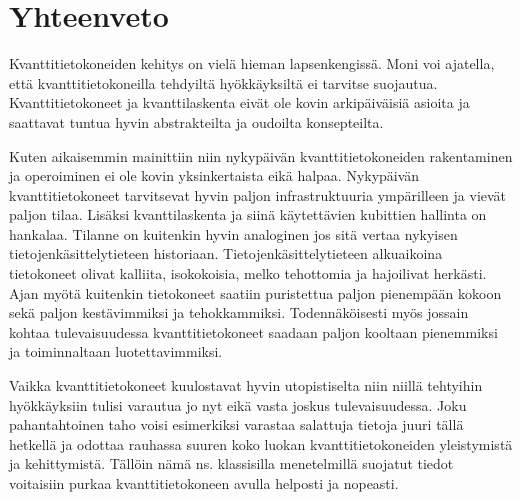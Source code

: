 \chapter{Yhteenveto\label{conclusions}}
Kvanttitietokoneiden kehitys on vielä hieman lapsenkengissä. Moni voi ajatella, että kvanttitietokoneilla tehdyiltä hyökkäyksiltä ei tarvitse suojautua. Kvanttitietokoneet ja kvanttilaskenta eivät ole kovin arkipäiväisiä asioita ja saattavat tuntua hyvin abstrakteilta ja oudoilta konsepteilta.

Kuten aikaisemmin mainittiin niin nykypäivän kvanttitietokoneiden rakentaminen ja operoiminen ei ole kovin yksinkertaista eikä halpaa. Nykypäivän kvanttitietokoneet tarvitsevat hyvin paljon infrastruktuuria ympärilleen ja vievät paljon tilaa. Lisäksi kvanttilaskenta ja siinä käytettävien kubittien hallinta on hankalaa. Tilanne on kuitenkin hyvin analoginen jos sitä vertaa nykyisen tietojenkäsittelytieteen historiaan. Tietojenkäsittelytieteen alkuaikoina tietokoneet olivat kalliita, isokokoisia, melko tehottomia ja hajoilivat herkästi. Ajan myötä kuitenkin tietokoneet saatiin puristettua paljon pienempään kokoon sekä paljon kestävimmiksi ja tehokkammiksi. Todennäköisesti myös jossain kohtaa tulevaisuudessa kvanttitietokoneet saadaan paljon kooltaan pienemmiksi ja toiminnaltaan luotettavimmiksi.

Vaikka kvanttitietokoneet kuulostavat hyvin utopistiselta niin niillä tehtyihin hyökkäyksiin tulisi varautua jo nyt eikä vasta joskus tulevaisuudessa. Joku pahantahtoinen taho voisi esimerkiksi varastaa salattuja tietoja juuri tällä hetkellä ja odottaa rauhassa suuren koko luokan kvanttitietokoneiden yleistymistä ja kehittymistä. Tällöin nämä ns. klassisilla menetelmillä suojatut tiedot voitaisiin purkaa kvanttitietokoneen avulla helposti ja nopeasti.